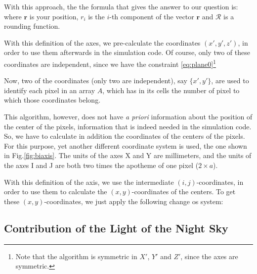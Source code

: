 With this approach, the the formula that gives the answer to our
question is:
%
\hexgrideq
%
where $\mathbf{r}$ is your position, $r_i$ is the $i$-th component of
the vector $\mathbf{r}$ and $\mathcal{R}$ is a rounding function.

\axesfigs


With this definition of the axes, we pre-calculate the coordinates
$(x',y',z')$, in order to use them afterwards in the simulation code.
Of course, only two of these coordinates are independent, since we
have the constraint \eqref{eq:plane0}\footnote{Note that the algorithm
  is symmetric in $X'$, $Y'$ and $Z'$, since the axes are symmetric.}
  
Now, two of the coordinates (only two are independent), say
$\{x',y'\}$, are used to identify each pixel in an array $A$, which
has in its cells the number of pixel to which those coordinates
belong.

This algorithm, however, does not have {\itshape a priori} information
about the position of the center of the pixels, information that is
indeed needed in the simulation code. So, we have to calculate in
addition the coordinates of the centers of the pixels. For this
purpose, yet another different coordinate system is used, the one
shown in Fig.\ref{fig:biaxis}. The units of the axes X and Y are
millimeters, and the units of the axes I and J are both two times the
apotheme of one pixel ($2 \times a$).


With this definition of the axis, we use the intermediate
$(i,j)$-coordinates, in order to use them to calculate the
$(x,y)$-coordinates of the centers. To get these $(x,y)$-coordinates,
we just apply the following change os system:
%
\bitoeucleq

\subsection{Contribution of the Light of the Night Sky}

